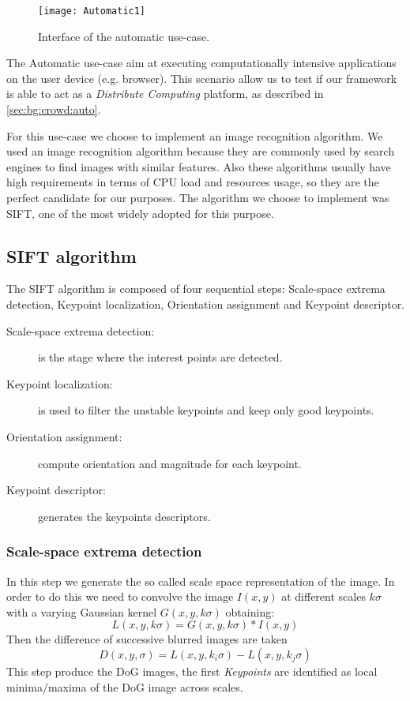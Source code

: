 \begin{figure}[htb]
    \centering
    \texttt{[image: Automatic1]}
    \caption{Interface of the automatic use-case.}
    \label{fig:Automatic1}
\end{figure}

The Automatic use-case aim at executing computationally intensive applications
on the user device (e.g. browser). This scenario allow us to test if our
framework is able to act as a \emph{Distribute Computing} platform, as described
in \ref{sec:bg:crowd:auto}.


For this use-case we choose to implement an image recognition algorithm.
We used an image recognition algorithm because they are commonly used
by search engines to find images with similar features. Also these algorithms
usually have high requirements in terms of CPU load and resources usage, so they
are the perfect candidate for our purposes. The algorithm we choose to implement
was \ac{SIFT}, one of the most widely adopted for this purpose.


\subsection{\acs{SIFT} algorithm}
The \ac{SIFT} algorithm is composed of four sequential steps: Scale-space extrema
detection, Keypoint localization, Orientation assignment and Keypoint descriptor.
\begin{description}
    \item[Scale-space extrema detection:] is the stage where the interest points 
    are detected.
    \item[Keypoint localization:] is used to filter the unstable keypoints and
    keep only good keypoints.
    \item[Orientation assignment:] compute orientation and magnitude for
    each keypoint.
    \item[Keypoint descriptor:] generates the keypoints descriptors.
\end{description}

\subsubsection{Scale-space extrema detection}
In this step we generate the so called scale space representation of the image.
In order to do this we need to convolve the image $I(x,y)$ at different scales
$k\sigma$ with a varying Gaussian kernel $G(x,y,k\sigma)$ obtaining:
\[
    L(x,y,k\sigma) = G(x,y,k\sigma) \ast I(x,y)
\]
Then the difference of successive blurred images are taken
\[
    D(x,y,\sigma) = L(x,y,k_i\sigma) - L(x,y,k_j\sigma)
\]
This step produce the \ac{DoG} images, the first \emph{Keypoints} are identified
as local minima/maxima of the \ac{DoG} image across scales.



